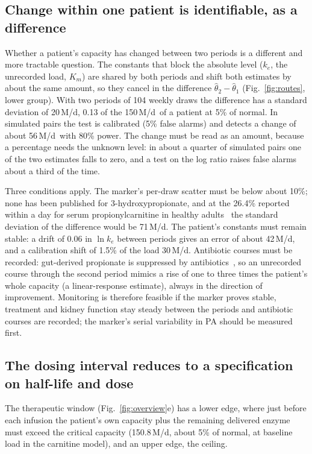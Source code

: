 \documentclass[11pt]{article}
\newcommand{\um}{\,\textmu M/d}
\begin{document}
\subsection*{Change within one patient is identifiable, as a difference}
Whether a patient's capacity has changed between two periods is a different and more tractable question. The constants that block the absolute level ($k_e$, the unrecorded load,
$K_m$) are shared by both periods and shift both estimates by about the same amount, so they cancel
in the difference $\hat\theta_2-\hat\theta_1$ (Fig.~\ref{fig:routes}, lower group). With two
periods of 104 weekly draws the difference has a standard deviation of 20\um, 0.13 of the
150\um\ of a patient at 5\% of normal. In simulated pairs the test is calibrated (5\% false
alarms) and detects a change of about 56\um\ with 80\% power. The change must be read as an amount, because a percentage needs the unknown
level: in about a quarter of simulated pairs one of the two estimates falls to zero, and a test on
the log ratio raises false alarms about a third of the time.

Three conditions apply. The marker's per-draw scatter must be below about 10\%; none has been
published for 3-hydroxypropionate, and at the 26.4\% reported within a day for serum
propionylcarnitine in healthy adults~\cite{thompson2012c3} the standard deviation of the difference
would be 71\um. The patient's constants must remain stable: a drift of 0.06 in $\ln k_e$ between
periods gives an error of about 42\um, and a calibration shift of 1.5\% of the load 30\um. Antibiotic courses must be recorded: gut-derived propionate is suppressed by antibiotics~\cite{metronidazole_pa}, so an unrecorded course through the second period mimics a rise of one to three times the patient's whole capacity (a linear-response estimate), always in
the direction of improvement. Monitoring is therefore feasible if the marker proves stable,
treatment and kidney function stay steady between the periods and antibiotic courses are
recorded; the marker's serial variability in PA should be measured first.

\subsection*{The dosing interval reduces to a specification on half-life and dose}
The therapeutic window (Fig.~\ref{fig:overview}e) has a lower edge, where just before each
infusion the patient's own capacity plus the remaining delivered enzyme must exceed the critical
capacity (150.8\um, about 5\% of normal, at baseline load in the carnitine model), and an upper
edge, the ceiling.
\end{document}
